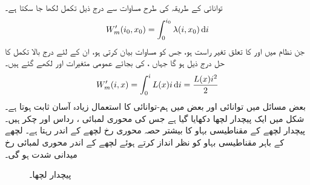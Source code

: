 توانائی کے طریقہ  کی طرح مساوات  سے درج ذیل تکمل لکھا جا سکتا ہے۔
\begin{align}
W_m'(i_0,x_0)=\int_{0}^{i_0} \lambda(i,x_0) \dif i
\end{align}
جن نظام میں  اور  کا تعلق تغیر راست ہو، جس کو مساوات  بیان کرتی ہو، ان کے لئے درج بالا تکمل کا حل درج ذیل ہو گا  جہاں ،  کی بجائے عمومی متغیرات  اور  لکھے گئے ہیں۔
\begin{align}\label{مساوات_تبادلہ_کوتوانائی_مساوی_امالہ_مربع_رو}
W_m'(i,x)=\int_{0}^{i} L(x) i  \dif i=\frac{L(x) i^2}{2}
\end{align}
بعض مسائل میں توانائی اور  بعض میں ہم-توانائی کا استعمال زیادہ آسان ثابت ہوتا ہے۔
%
شکل   میں ایک پیچدار لچھا دکھایا گیا ہے جس کی محوری لمبائی ،   رداس   اور چکر   ہیں۔پیچدار لچھے کے مقناطیسی بہاو کا بیشتر حصہ محوری رخ  لچھے کے اندر رہتا ہے۔ لچھے کے باہر مقناطیسی بہاو کو نظر انداز کرتے ہوئے  لچھے کے اندر محوری لمبائی رخ میدانی شدت  ہو گی۔
\begin{figure}
\centering
%
\caption{پیچدار لچھا۔}
\label{شکل_تبادلہ_توانائی_پیچدار_لچھا}
\end{figure}


